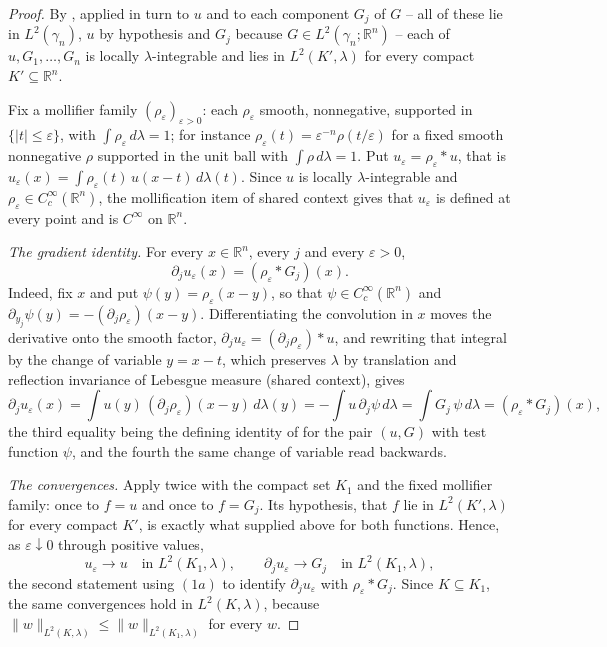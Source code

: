 \begin{proof}
By , applied in turn to $u$ and to each
component $G_j$ of $G$ -- all of these lie in $L^2(\gamma_n)$, $u$ by hypothesis
and $G_j$ because $G \in L^2(\gamma_n;\mathbb{R}^n)$ -- each of
$u, G_1, \ldots, G_n$ is locally $\lambda$-integrable and lies in
$L^2(K',\lambda)$ for every compact $K' \subseteq \mathbb{R}^n$.

Fix a mollifier family $(\rho_\varepsilon)_{\varepsilon>0}$: each
$\rho_\varepsilon$ smooth, nonnegative, supported in $\{|t| \leq \varepsilon\}$,
with $\int\rho_\varepsilon\,d\lambda = 1$; for instance
$\rho_\varepsilon(t) = \varepsilon^{-n}\rho(t/\varepsilon)$ for a fixed smooth
nonnegative $\rho$ supported in the unit ball with $\int\rho\,d\lambda = 1$.  Put
$u_\varepsilon = \rho_\varepsilon * u$, that is
$u_\varepsilon(x) = \int \rho_\varepsilon(t)\,u(x-t)\,d\lambda(t)$.  Since $u$ is
locally $\lambda$-integrable and $\rho_\varepsilon \in C_c^\infty(\mathbb{R}^n)$,
the mollification item of shared context gives that $u_\varepsilon$ is defined at
every point and is $C^\infty$ on $\mathbb{R}^n$.

\emph{The gradient identity.}  For every $x \in \mathbb{R}^n$, every $j$ and every
$\varepsilon > 0$,
\begin{equation*}
  \partial_j u_\varepsilon(x) = (\rho_\varepsilon * G_j)(x) . \tag{1a}
\end{equation*}
Indeed, fix $x$ and put $\psi(y) = \rho_\varepsilon(x-y)$, so that
$\psi \in C_c^\infty(\mathbb{R}^n)$ and
$\partial_{y_j}\psi(y) = -(\partial_j\rho_\varepsilon)(x-y)$.  Differentiating the
convolution in $x$ moves the derivative onto the smooth factor,
$\partial_j u_\varepsilon = (\partial_j\rho_\varepsilon) * u$, and rewriting that
integral by the change of variable $y = x - t$, which preserves $\lambda$ by
translation and reflection invariance of Lebesgue measure (shared context), gives
\[
  \partial_j u_\varepsilon(x)
    = \int u(y)\,(\partial_j\rho_\varepsilon)(x-y)\,d\lambda(y)
    = -\int u\,\partial_j\psi\, d\lambda
    = \int G_j\,\psi\, d\lambda
    = (\rho_\varepsilon * G_j)(x) ,
\]
the third equality being the defining identity of  for
the pair $(u,G)$ with test function $\psi$, and the fourth the same change of
variable read backwards.

\emph{The convergences.}  Apply  twice with the compact
set $K_1$ and the fixed mollifier family: once to $f = u$ and once to $f = G_j$.
Its hypothesis, that $f$ lie in $L^2(K',\lambda)$ for every compact $K'$, is
exactly what  supplied above for both
functions.  Hence, as $\varepsilon \downarrow 0$ through positive values,
\[
  u_\varepsilon \to u \quad\text{in } L^2(K_1,\lambda),
  \qquad
  \partial_j u_\varepsilon \to G_j \quad\text{in } L^2(K_1,\lambda),
\]
the second statement using $(1a)$ to identify $\partial_j u_\varepsilon$ with
$\rho_\varepsilon * G_j$.  Since $K \subseteq K_1$, the same convergences hold in
$L^2(K,\lambda)$, because $\|w\|_{L^2(K,\lambda)} \leq \|w\|_{L^2(K_1,\lambda)}$
for every $w$.


\end{proof}
